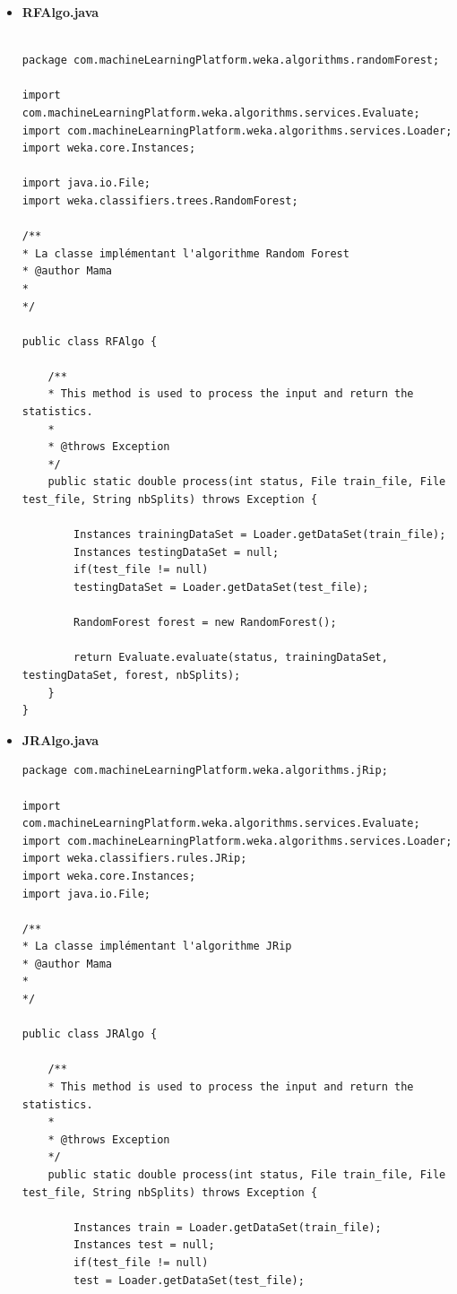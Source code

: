 \documentclass[a4paper,11pt]{article}
\begin{document}
\begin{itemize}
\item \textbf{RFAlgo.java}
\begin{verbatim}

package com.machineLearningPlatform.weka.algorithms.randomForest;

import com.machineLearningPlatform.weka.algorithms.services.Evaluate;
import com.machineLearningPlatform.weka.algorithms.services.Loader;
import weka.core.Instances;

import java.io.File;
import weka.classifiers.trees.RandomForest;

/**
* La classe implémentant l'algorithme Random Forest
* @author Mama
*
*/

public class RFAlgo {

    /**
    * This method is used to process the input and return the statistics.
    *
    * @throws Exception
    */
    public static double process(int status, File train_file, File test_file, String nbSplits) throws Exception {

        Instances trainingDataSet = Loader.getDataSet(train_file);
        Instances testingDataSet = null;
        if(test_file != null)
        testingDataSet = Loader.getDataSet(test_file);

        RandomForest forest = new RandomForest();

        return Evaluate.evaluate(status, trainingDataSet, testingDataSet, forest, nbSplits);
    }
}

\end{verbatim}
\item \textbf{JRAlgo.java}
\begin{verbatim}
package com.machineLearningPlatform.weka.algorithms.jRip;

import com.machineLearningPlatform.weka.algorithms.services.Evaluate;
import com.machineLearningPlatform.weka.algorithms.services.Loader;
import weka.classifiers.rules.JRip;
import weka.core.Instances;
import java.io.File;

/**
* La classe implémentant l'algorithme JRip
* @author Mama
*
*/

public class JRAlgo {

    /**
    * This method is used to process the input and return the statistics.
    *
    * @throws Exception
    */
    public static double process(int status, File train_file, File test_file, String nbSplits) throws Exception {

        Instances train = Loader.getDataSet(train_file);
        Instances test = null;
        if(test_file != null)
        test = Loader.getDataSet(test_file);


\end{verbatim}
\end{itemize}
\end{document}
